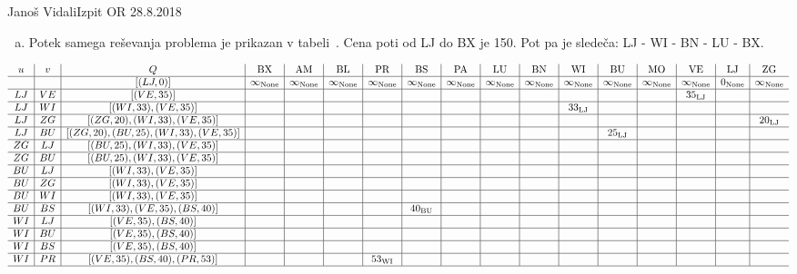 \begin{naloga}{Janoš Vidali}{Izpit OR 28.8.2018}
\begin{odgovor}
\begin{enumerate}[(a)]
\item Potek samega reševanja problema je prikazan v tabeli~\tab. Cena poti od LJ do BX je 150. Pot pa je sledeča: LJ - WI - BN - LU - BX.
\end{enumerate}
\begin{tabela}
\begin{small}
$$
\begin{array}{c|c|c|c|c|c|c|c|c|c|c|c|c|c|c|c|c}
u & v & Q & \text{BX} &   \text{AM} &  \text{BL} &  \text{PR} & \text{BS} &  \text{PA} & \text{LU} &  \text{BN} & \text{WI} &  \text{BU} &  \text{MO} &  \text{VE} &  \text{LJ} &  \text{ZG} \\ \hline
 & & [(LJ, 0)] & \infty_{\text{None}} & \infty_{\text{None}}& \infty_{\text{None}} & \infty_{\text{None}} & \infty_{\text{None}} & \infty_{\text{None}} & \infty_{\text{None}} & \infty_{\text{None}} & \infty_{\text{None}} & \infty_{\text{None}} & \infty_{\text{None}} & \infty_{\text{None}} & 0_{\text{None}} & \infty_{\text{None}} \\ \hline
LJ &VE & [(VE, 35)] & & & & & & & & & & & & 35_{\text{LJ}} & & \\ \hline
LJ & WI & [(WI, 33), (VE, 35)] & & & & & & & & & 33_{\text{LJ}} & & & & & \\ \hline
LJ & ZG & [(ZG, 20), (WI, 33), (VE, 35)] & & & & & & & & & & & & & & 20_{\text{LJ}}\\ \hline
LJ & BU & [(ZG, 20), (BU, 25),  (WI, 33), (VE, 35)] & & & & & & & & & & 25_{\text{LJ}} & & & & \\ \hline
ZG & LJ & [(BU, 25),  (WI, 33), (VE, 35)] & & & & & & & & & & & & & & \\ \hline
ZG & BU & [(BU, 25),  (WI, 33), (VE, 35)] & & & & & & & & & & & & & & \\ \hline
BU & LJ & [(WI, 33), (VE, 35)] & & & & & & & & & & & & & & \\ \hline
BU & ZG & [(WI, 33), (VE, 35)] & & & & & & & & & & & & & & \\ \hline
BU & WI & [(WI, 33), (VE, 35)] & & & & & & & & & & & & & & \\ \hline
BU & BS & [(WI, 33), (VE, 35), (BS, 40)] & & & & & 40_{\text{BU}} & & & & & & & & & \\ \hline
WI & LJ & [(VE, 35), (BS, 40)] & & & & & & & & & & & & & & \\ \hline
WI & BU & [(VE, 35), (BS, 40)] & & & & & & & & & & & & & & \\ \hline
WI & BS & [(VE, 35), (BS, 40)] & & & & & & & & & & & & & & \\ \hline
WI & PR & [(VE, 35), (BS, 40), (PR, 53)] & & & & 53_{\text{WI}} & & & & & & & & & & \\ \hline

\end{array}$$
\end{small}
\end{tabela}
\end{odgovor}
\end{naloga}
